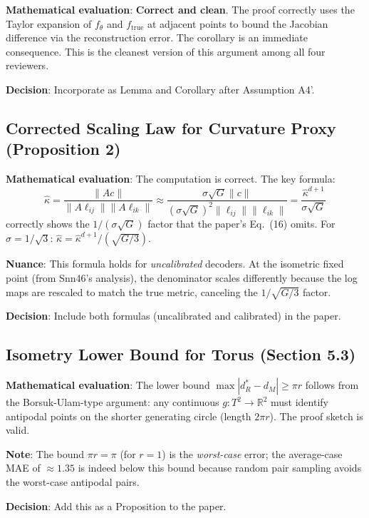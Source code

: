 \documentclass{article}
\begin{document}
\textbf{Mathematical evaluation}: \textbf{Correct and clean}. The proof correctly
uses the Taylor expansion of $f_\theta$ and $f_{\mathrm{true}}$ at adjacent points
to bound the Jacobian difference via the reconstruction error. The corollary is
an immediate consequence. This is the cleanest version of this argument among
all four reviewers.

\textbf{Decision}: Incorporate as Lemma and Corollary after Assumption A4'.

\subsection{Corrected Scaling Law for Curvature Proxy (Proposition 2)}

\textbf{Mathematical evaluation}: The computation is correct. The key formula:
\[
  \hat{\kappa} = \frac{\|Ac\|}{\|A\ell_{ij}\|\|A\ell_{ik}\|}
  \approx \frac{\sigma\sqrt{G}\|c\|}{(\sigma\sqrt{G})^2 \|\ell_{ij}\|\|\ell_{ik}\|}
  = \frac{\hat{\kappa}^{d+1}}{\sigma\sqrt{G}}
\]
correctly shows the $1/(\sigma\sqrt{G})$ factor that the paper's Eq.~(16) omits.
For $\sigma = 1/\sqrt{3}$: $\hat{\kappa} = \hat{\kappa}^{d+1} / (\sqrt{G/3})$.

\textbf{Nuance}: This formula holds for \emph{uncalibrated} decoders. At the
isometric fixed point (from Snn46's analysis), the denominator scales differently
because the log maps are rescaled to match the true metric, canceling the
$1/\sqrt{G/3}$ factor.

\textbf{Decision}: Include both formulas (uncalibrated and calibrated) in the paper.

\subsection{Isometry Lower Bound for Torus (Section 5.3)}

\textbf{Mathematical evaluation}: The lower bound $\max|d_R^* - d_M| \geq \pi r$
follows from the Borsuk-Ulam-type argument: any continuous $g: T^2 \to \mathbb{R}^2$
must identify antipodal points on the shorter generating circle (length $2\pi r$).
The proof sketch is valid.

\textbf{Note}: The bound $\pi r = \pi$ (for $r=1$) is the \emph{worst-case}
error; the average-case MAE of $\approx 1.35$ is indeed below this bound because
random pair sampling avoids the worst-case antipodal pairs.

\textbf{Decision}: Add this as a Proposition to the paper.
\end{document}
